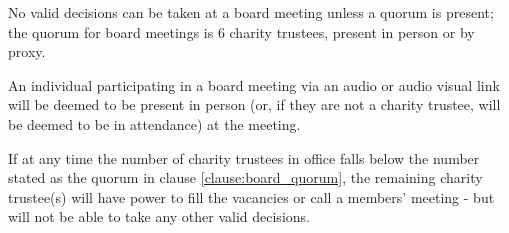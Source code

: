 ﻿\documentclass[a4paper,11pt,onecolumn ]{article}
\begin{document}
\begin{legal}
\item \label{clause:board_quorum} No valid decisions can be taken at a board meeting unless a quorum is present; the quorum for board meetings is 6 charity trustees, present in person or by proxy.
\item An individual participating in a board meeting via an audio or audio visual link will be deemed to be present in person (or, if they are not a charity trustee, will be deemed to be in attendance) at the meeting.
\item If at any time the number of charity trustees in office falls below the number stated as the quorum in clause \ref{clause:board_quorum}, the remaining charity trustee(s) will have power to fill the vacancies or call a members' meeting - but will not be able to take any other valid decisions.


\end{legal}
\end{document}

